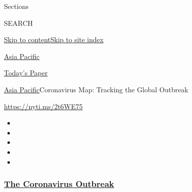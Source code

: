 Sections

SEARCH

\protect\hyperlink{site-content}{Skip to
content}\protect\hyperlink{site-index}{Skip to site index}

\href{https://www.nytimes3xbfgragh.onion/section/world/asia}{Asia
Pacific}

\href{https://myaccount.nytimes3xbfgragh.onion/auth/login?response_type=cookie\&client_id=vi}{}

\href{https://www.nytimes3xbfgragh.onion/section/todayspaper}{Today's
Paper}

\href{/section/world/asia}{Asia Pacific}\textbar{}Coronavirus Map:
Tracking the Global Outbreak

\url{https://nyti.ms/2t6WE75}

\begin{itemize}
\item
\item
\item
\item
\item
\end{itemize}

\hypertarget{the-coronavirus-outbreak}{%
\subsubsection{\texorpdfstring{\href{https://www.nytimes3xbfgragh.onion/news-event/coronavirus?name=styln-coronavirus-national\&region=TOP_BANNER\&block=storyline_menu_recirc\&action=click\&pgtype=Interactive\&impression_id=aecb3550-efba-11ea-b68e-f70513192fc8\&variant=undefined}{The
Coronavirus
Outbreak}}{The Coronavirus Outbreak}}\label{the-coronavirus-outbreak}}

